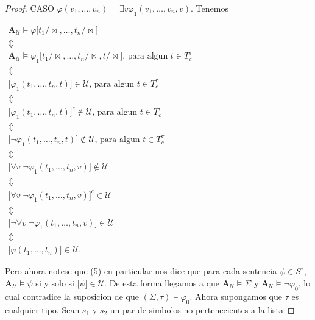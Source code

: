 \begin{proof}
    CASO $\varphi (v_{1}, \dotsc, v_{n})=\exists v\varphi_{1}(v_{1}, \dotsc, v_{n},v).$
    Tenemos

    $\displaystyle \begin{array}{c} \mathbf{A}_{\mathcal{U}}\models \varphi \lbrack t_{1}/\mathrm{\bowtie } , \dotsc, t_{n}/\mathrm{\bowtie }\rbrack \\ \Updownarrow \\ \mathbf{A}_{\mathcal{U}}\models \varphi_{1}\lbrack t_{1}/\mathrm{\bowtie } , \dotsc, t_{n}/\mathrm{\bowtie },t/\mathrm{\bowtie }\rbrack\text{, para algun }t\in T_{c}^{\tau } \\ \Updownarrow \\ \lbrack \varphi_{1}(t_{1}, \dotsc, t_{n},t)\rbrack\in \mathcal{U}\text{, para algun } t\in T_{c}^{\tau } \\ \Updownarrow \\ \lbrack \varphi_{1}(t_{1}, \dotsc, t_{n},t)\rbrack^{c}\not\in \mathcal{U}\text{, para algun }t\in T_{c}^{\tau } \\ \Updownarrow \\ \lbrack \lnot \varphi_{1}(t_{1}, \dotsc, t_{n},t)\rbrack\not\in \mathcal{U}\text{, para algun }t\in T_{c}^{\tau } \\ \Updownarrow \\ \lbrack \forall v\;\lnot \varphi_{1}(t_{1}, \dotsc, t_{n},v)\rbrack\not\in \mathcal{U} \\ \Updownarrow \\ \lbrack \forall v\;\lnot \varphi_{1}(t_{1}, \dotsc, t_{n},v)\rbrack^{c}\in \mathcal{U} \\ \Updownarrow \\ \lbrack \lnot \forall v\;\lnot \varphi_{1}(t_{1}, \dotsc, t_{n},v)\rbrack\in \mathcal{U } \\ \Updownarrow \\ \lbrack \varphi (t_{1}, \dotsc, t_{n})\rbrack\in \mathcal{U}. \end{array} $

    Pero ahora notese que (5) en particular nos dice que para cada sentencia $ \psi \in S^{\tau }$, $\mathbf{A}_{\mathcal{U}}\models \psi $ si y solo si $ \lbrack\psi \rbrack\in \mathcal{U}.$ De esta forma llegamos a que $\mathbf{A}_{\mathcal{U }}\models \Sigma $ y $\mathbf{A}_{\mathcal{U}}\models \lnot \varphi_{0}$, lo cual contradice la suposicion de que $(\Sigma, \tau)\models \varphi_{0}. $
    Ahora supongamos que $\tau $ es cualquier tipo. Sean $s_{1}$ y $s_{2}$ un par de simbolos no pertenecientes a la lista


\end{proof}
